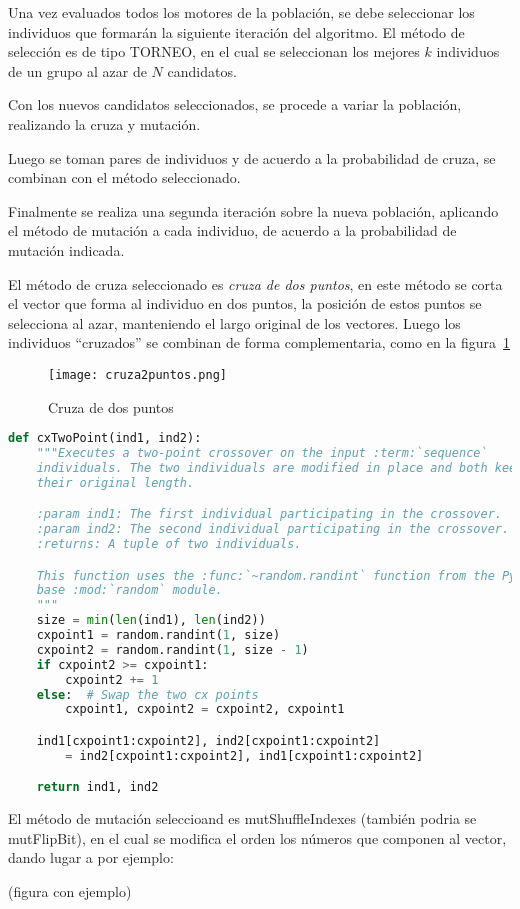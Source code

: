 Una vez evaluados todos los motores de la población, se debe seleccionar los
individuos que formarán la siguiente iteración del algoritmo.
%
El método de selección es de tipo TORNEO, en el cual se seleccionan los mejores
$k$ individuos de un grupo al azar de $N$ candidatos.
%

Con los nuevos candidatos seleccionados, se procede a variar la población,
realizando la cruza y mutación.

Luego se toman pares de individuos y de acuerdo a la probabilidad de cruza, se
combinan con el método seleccionado.

Finalmente se realiza una segunda iteración sobre la nueva población, aplicando
el método de mutación a cada individuo, de acuerdo a la probabilidad de
mutación indicada.


El método de cruza seleccionado es \emph{cruza de dos puntos}, en este método
se corta el vector que forma al individuo en dos puntos, la posición de estos
puntos se selecciona al azar, manteniendo el largo original de los vectores.
%
Luego los individuos ``cruzados'' se combinan de forma complementaria, como en
la figura~\ref{fig:cr2puntos}

\begin{figure}
  \centering
  \texttt{[image: cruza2puntos.png]}
  \caption{Cruza de dos puntos}\label{fig:cr2puntos}
\end{figure}


\begin{lstlisting}[language=Python]
def cxTwoPoint(ind1, ind2):
    """Executes a two-point crossover on the input :term:`sequence`
    individuals. The two individuals are modified in place and both keep
    their original length.

    :param ind1: The first individual participating in the crossover.
    :param ind2: The second individual participating in the crossover.
    :returns: A tuple of two individuals.

    This function uses the :func:`~random.randint` function from the Python
    base :mod:`random` module.
    """
    size = min(len(ind1), len(ind2))
    cxpoint1 = random.randint(1, size)
    cxpoint2 = random.randint(1, size - 1)
    if cxpoint2 >= cxpoint1:
        cxpoint2 += 1
    else:  # Swap the two cx points
        cxpoint1, cxpoint2 = cxpoint2, cxpoint1

    ind1[cxpoint1:cxpoint2], ind2[cxpoint1:cxpoint2]
        = ind2[cxpoint1:cxpoint2], ind1[cxpoint1:cxpoint2]

    return ind1, ind2
\end{lstlisting}


El método de mutación seleccioand es mutShuffleIndexes (también podria se
mutFlipBit), en el cual se modifica el orden los números que componen al vector, dando lugar a por ejemplo:

(figura con ejemplo)
